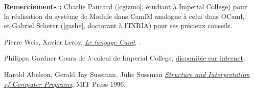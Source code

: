 \documentclass[a4paper, 12pt]{article}
\begin{document}
\textbf{Remerciements : } Charlie Paucard (|cgizmo|, étudiant à Imperial College) pour la réalisation du système de Module dans CamlM analogue à celui dans OCaml, et Gabriel Scherer (|gashe|, doctorant à l'INRIA)  
pour ses précieux conseils.
\begin{thebibliography}{}

  Pierre Weis, Xavier Leroy, 
  \newblock \textit{\href{http://caml.inria.fr/distrib/books/}{Le langage Caml}},
  .
 
  \bibitem{}
  Philippa Gardner
  \newblock Cours de $\lambda$-calcul de Imperial College,      \href{https://piazza.com/imperial.ac.uk/fall2012/240/resources}{disponible sur internet}.
  
  Harold Abelson, Gerald Jay Sussman, Julie Sussman
  \newblock \textit{\href{http://mitpress.mit.edu/sicp/}{Structure and Interpretation of Computer Programs}},
  \newblock MIT Press 1996.
  
\end{thebibliography} 
\end{document}
